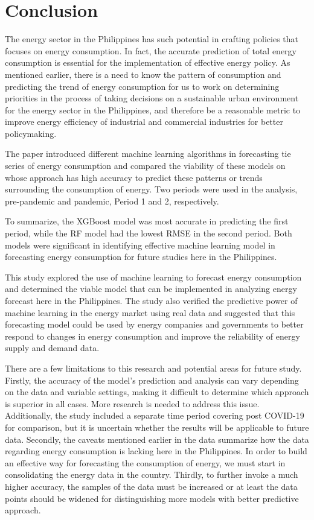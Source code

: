 \documentclass[runningheads]{llncs}
\begin{document}
\section{Conclusion}
The energy sector in the Philippines has such potential in crafting policies that focuses on energy consumption. In fact, the accurate prediction of total energy consumption is essential for the implementation of effective energy policy. As mentioned earlier, there is a need to know the pattern of consumption and predicting the trend of energy consumption for us to work on determining priorities in the process of taking decisions on a sustainable urban environment for the energy sector in the Philippines, and therefore be a reasonable metric to improve energy efficiency of industrial and commercial industries for better policymaking.

The paper introduced different machine learning algorithms in forecasting tie series of energy consumption and compared the viability of these models on whose approach has high accuracy to predict these patterns or trends surrounding the consumption of energy. Two periods were used in the analysis, pre-pandemic and pandemic, Period 1 and 2, respectively.

To summarize, the XGBoost model was most accurate in predicting the first period, while the RF model had the lowest RMSE in the second period. Both models were significant in identifying effective machine learning model in forecasting energy consumption for future studies here in the Philippines.

This study explored the use of machine learning to forecast energy consumption and determined the viable model that can be implemented in analyzing energy forecast here in the Philippines. The study also verified the predictive power of machine learning in the energy market using real data and suggested that this forecasting model could be used by energy companies and governments to better respond to changes in energy consumption and improve the reliability of energy supply and demand data.

There are a few limitations to this research and potential areas for future study. Firstly, the accuracy of the model's prediction and analysis can vary depending on the data and variable settings, making it difficult to determine which approach is superior in all cases. More research is needed to address this issue. Additionally, the study included a separate time period covering post COVID-19 for comparison, but it is uncertain whether the results will be applicable to future data. Secondly, the caveats mentioned earlier in the data summarize how the data regarding energy consumption is lacking here in the Philippines. In order to build an effective way for forecasting the consumption of energy, we must start in consolidating the energy data in the country. Thirdly, to further invoke a much higher accuracy, the samples of the data must be increased or at least the data points should be widened for distinguishing more models with better predictive approach.
\end{document}
